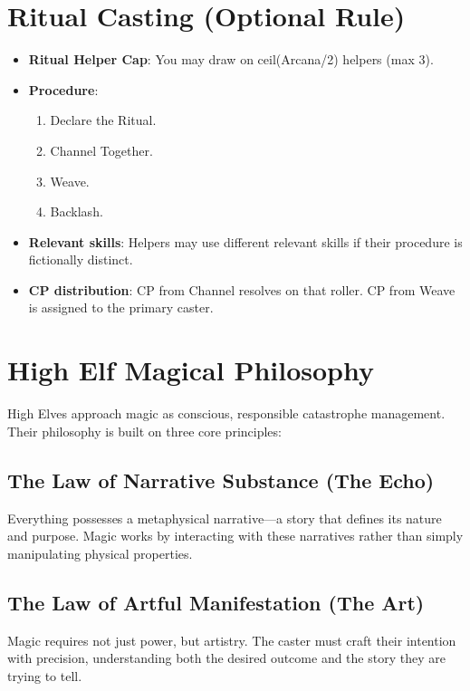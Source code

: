 \section{Ritual Casting (Optional Rule)}
\begin{itemize}
    \item \textbf{Ritual Helper Cap}: You may draw on ceil(Arcana/2) helpers (max 3).
    \item \textbf{Procedure}:
    \begin{enumerate}
        \item Declare the Ritual.
        \item Channel Together.
        \item Weave.
        \item Backlash.
    \end{enumerate}
    \item \textbf{Relevant skills}: Helpers may use different relevant skills if their procedure is fictionally distinct.
    \item \textbf{CP distribution}: CP from Channel resolves on that roller. CP from Weave is assigned to the primary caster.
\end{itemize}

\section{High Elf Magical Philosophy}

High Elves approach magic as conscious, responsible catastrophe management. Their philosophy is built on three core principles:

\subsection{The Law of Narrative Substance (The Echo)}
Everything possesses a metaphysical narrative—a story that defines its nature and purpose. Magic works by interacting with these narratives rather than simply manipulating physical properties.

\subsection{The Law of Artful Manifestation (The Art)}
Magic requires not just power, but artistry. The caster must craft their intention with precision, understanding both the desired outcome and the story they are trying to tell.

